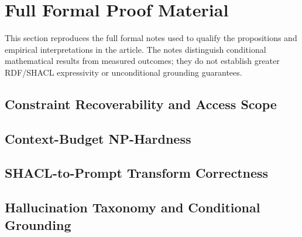 \documentclass[10pt,a4paper]{article}
\newcommand{\artifact}[2]{%
  }
\begin{document}
\section{Full Formal Proof Material}
\label{sec:proofs}
This section reproduces the full formal notes used to qualify the propositions and empirical interpretations in the article. The notes distinguish conditional mathematical results from measured outcomes; they do not establish greater RDF/SHACL expressivity or unconditional grounding guarantees.

\subsection{Constraint Recoverability and Access Scope}
\artifact{proofs/expressiveness_and_decidability.md}{Formal notes on constraint recoverability, information access and architectural scope.}
\subsection{Context-Budget NP-Hardness}
\artifact{proofs/context_budget_nphard.md}{Full proof notes for context-budget NP-hardness.}
\subsection{SHACL-to-Prompt Transform Correctness}
\artifact{proofs/transform_correctness.md}{Full proof notes for SHACL-to-prompt transform correctness.}
\subsection{Hallucination Taxonomy and Conditional Grounding}
\artifact{proofs/hallucination_taxonomy.md}{Formalisation of the hallucination taxonomy and the conditional zero-error result.}
\end{document}
